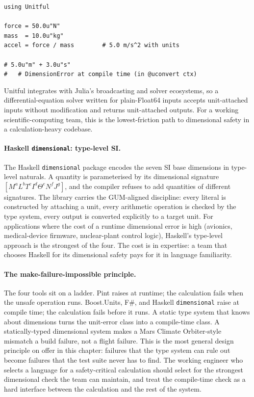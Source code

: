 \begin{verbatim}
using Unitful

force = 50.0u"N"
mass  = 10.0u"kg"
accel = force / mass        # 5.0 m/s^2 with units

# 5.0u"m" + 3.0u"s"
#   # DimensionError at compile time (in @uconvert ctx)
\end{verbatim}

Unitful integrates with Julia's broadcasting and solver
ecosystems, so a differential-equation solver written for
plain-Float64 inputs accepts unit-attached inputs without
modification and returns unit-attached outputs. For a working
scientific-computing team, this is the lowest-friction path to
dimensional safety in a calculation-heavy codebase.

\paragraph{Haskell \texttt{dimensional}: type-level SI.}
The Haskell \texttt{dimensional} package \cite{web:ch02t3-haskell-dimensional}
encodes the seven SI base dimensions in type-level naturals. A
quantity is parameterised by its dimensional signature
$[M^{a} L^{b} T^{c} I^{d} \Theta^{e} N^{f} J^{g}]$, and the
compiler refuses to add quantities of different signatures. The
library carries the GUM-aligned discipline: every literal is
constructed by attaching a unit, every arithmetic operation is
checked by the type system, every output is converted explicitly
to a target unit. For applications where the cost of a runtime
dimensional error is high (avionics, medical-device firmware,
nuclear-plant control logic), Haskell's type-level approach is
the strongest of the four. The cost is in expertise: a team that
chooses Haskell for its dimensional safety pays for it in language
familiarity.

\paragraph{The make-failure-impossible principle.}
The four tools sit on a ladder. Pint raises at runtime; the
calculation fails when the unsafe operation runs. Boost.Units, F\#,
and Haskell \texttt{dimensional} raise at compile time; the
calculation fails before it runs. A static type system that knows
about dimensions turns the unit-error class into a compile-time
class. A statically-typed dimensional system makes a Mars Climate
Orbiter-style mismatch a build failure, not a flight failure.
This is the most general design principle on offer in this
chapter: failures that the type system can rule out become
failures that the test suite never has to find. The working
engineer who selects a language for a safety-critical calculation
should select for the strongest dimensional check the team can
maintain, and treat the compile-time check as a hard interface
between the calculation and the rest of the system.

